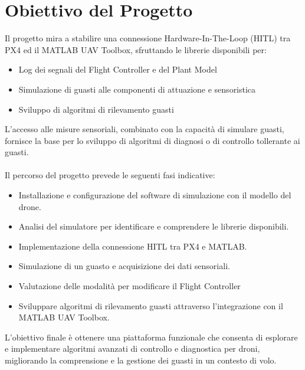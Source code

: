 \section{Obiettivo del Progetto}
Il progetto mira a stabilire una connessione Hardware-In-The-Loop (HITL) tra PX4 ed il MATLAB UAV Toolbox, sfruttando le librerie disponibili per:
\begin{itemize}
    \item Log dei segnali del Flight Controller e del Plant Model
    \item Simulazione di guasti alle componenti di attuazione e sensoristica
    \item Sviluppo di algoritmi di rilevamento guasti
\end{itemize}
L'accesso alle misure sensoriali, combinato con la capacità di simulare guasti, fornisce la base per lo sviluppo di algoritmi di diagnosi o di controllo tollerante ai guasti.
\\~\\
Il percorso del progetto prevede le seguenti fasi indicative:
\begin{itemize}
    \item Installazione e configurazione del software di simulazione con il modello del drone.
    \item Analisi del simulatore per identificare e comprendere le librerie disponibili.
    \item Implementazione della connessione HITL tra PX4 e MATLAB.
    \item Simulazione di un guasto e acquisizione dei dati sensoriali.
    \item Valutazione delle modalità per modificare il Flight Controller
    \item Sviluppare algoritmi di rilevamento guasti attraverso l'integrazione con il MATLAB UAV Toolbox.
\end{itemize}
L'obiettivo finale è ottenere una piattaforma funzionale che consenta di esplorare e implementare algoritmi avanzati di controllo e diagnostica per droni, migliorando la comprensione e la gestione dei guasti in un contesto di volo.